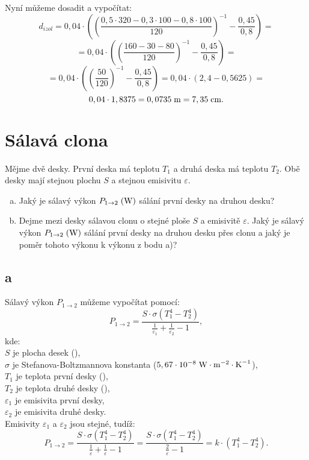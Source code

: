 \documentclass{article}
\begin{document}
Nyní můžeme dosadit a vypočítat:
$$
    d_{izol} = 0,04 \cdot \left( \left( \frac{0,5 \cdot 320 - 0,3 \cdot 100 - 0,8 \cdot 100}{120} \right)^{-1} - \frac{0,45}{0,8} \right) =
$$
$$
    = 0,04 \cdot \left( \left( \frac{160 - 30 - 80}{120} \right)^{-1} - \frac{0,45}{0,8} \right) =
$$
$$
    = 0,04 \cdot \left( \left( \frac{50}{120} \right)^{-1} - \frac{0,45}{0,8} \right) = 0,04 \cdot (2,4 - 0,5625) =
$$
$$
    0,04 \cdot 1,8375 = 0,0735 \; \textrm{m} = 7,35 \; \textrm{cm}.
$$

\newpage




\section{ Sálavá clona \spicy \spicy}
Mějme dvě desky. První deska má teplotu $T_1$ a druhá deska má teplotu $T_2$. Obě desky mají stejnou plochu $S$ a stejnou emisivitu $\varepsilon$.
\begin{enumerate}[a)]
    \item Jaký je sálavý výkon $P_{1 \rightarrow 2} \; (\textrm{W})$ sálání první desky na druhou desku?
    \item Dejme mezi desky sálavou clonu o stejné ploše $S$ a emisivitě $\varepsilon$. Jaký je sálavý výkon $P_{1 \rightarrow 2} \; (\textrm{W})$ sálání první desky na druhou desku přes clonu a jaký je poměr tohoto výkonu k výkonu z bodu a)?
\end{enumerate}



\subsection{a}
Sálavý výkon $P_{1 \rightarrow 2}$ můžeme vypočítat pomocí:
$$
    P_{1 \rightarrow 2} = \frac{S \cdot \sigma \left( T_1^4 - T_2^4 \right)}{\frac{1}{\varepsilon_1} + \frac{1}{\varepsilon_2} - 1},
$$
kde:\\
$S$ je plocha desek (\ueqMsq),\\
$\sigma$ je Stefanova-Boltzmannova konstanta ($5,67 \cdot 10^{-8} \; \textrm{W} \cdot \textrm{m}^{-2} \cdot \textrm{K}^{-1}$),\\
$T_1$ je teplota první desky (\uK),\\
$T_2$ je teplota druhé desky (\uK),\\
$\varepsilon_1$ je emisivita první desky,\\
$\varepsilon_2$ je emisivita druhé desky.\\

Emisivity $\varepsilon_1$ a $\varepsilon_2$ jsou stejné, tudíž:
$$
    P_{1 \rightarrow 2} = \frac{S \cdot \sigma \left( T_1^4 - T_2^4 \right)}{\frac{1}{\varepsilon} + \frac{1}{\varepsilon} - 1} = \frac{S \cdot \sigma \left( T_1^4 - T_2^4 \right)}{\frac{2}{\varepsilon} - 1} = k \cdot \left( T_1^4 - T_2^4 \right).
$$
\end{document}
